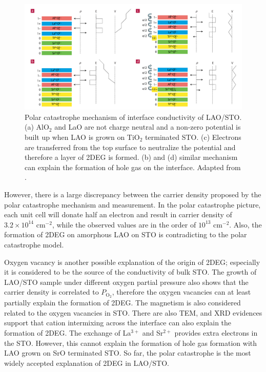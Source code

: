 \documentclass[pdflatex, sectionletters, 12pt]{pittetd}    %
\begin{document}
\begin{figure}[h!]
	\centering
	\includegraphics[width=1.0\textwidth]{Drawing/PolarCatastrophe.pdf}
	\caption{Polar catastrophe mechanism of interface conductivity of LAO/STO. (a) AlO$_2$ and LaO are not charge neutral and a non-zero potential is built up when LAO is grown on TiO$_2$ terminated STO. (c) Electrons are transferred from the top surface to neutralize the potential and therefore a layer of 2DEG is formed. (b) and (d) similar mechanism can explain the formation of hole gas on the interface. Adapted from \cite{nakagawa2006some}.}
	\label{FIG:PolarCatastrophe}
\end{figure}

However, there is a large discrepancy between the carrier density proposed by the polar catastrophe mechanism and measurement. In the polar catastrophe picture, each unit cell will donate half an electron and result in carrier density of $3.2 \times 10^{14}$ cm$^{-2}$, while the observed values are in the order of $10^{13}$ cm$^{-2}$. Also, the formation of 2DEG on amorphous LAO on STO is contradicting to the polar catastrophe model. 

Oxygen vacancy is another possible explanation of the origin of 2DEG\cite{kalabukhov2007effect}; especially it is considered to be the source of the conductivity of bulk STO\cite{schooley1965dependence}. The growth of LAO/STO sample under different oxygen partial pressure also shows that the carrier density is correlated to $P_{\mathrm{O_2}}$, therefore the oxygen vacancies can at least partially explain the formation of 2DEG. The magnetism is also considered related to the oxygen vacancies in STO. There are also TEM\cite{nakagawa2006some}, and XRD\cite{willmott2007structural} evidences support that cation intermixing across the interface can also explain the formation of 2DEG. The exchange of La$^{3+}$ and Sr$^{2+}$ provides extra electrons in the STO. However, this cannot explain the formation of hole gas formation with LAO grown on SrO terminated STO. So far, the polar catastrophe is the most widely accepted explanation of 2DEG in LAO/STO.
\end{document}
